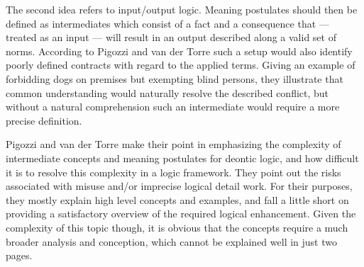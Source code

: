 \documentclass[12pt]{article}
\begin{document}
The second idea refers to input/output logic. Meaning postulates should then be defined as intermediates which consist of a fact and a consequence that --- treated as an input --- will result in an output described along a valid set of norms. According to Pigozzi and van der Torre such a setup would also identify poorly defined contracts with regard to the applied terms. Giving an example of forbidding dogs on premises but exempting blind persons, they illustrate that common understanding would naturally resolve the described conflict, but without a natural comprehension such an intermediate would require a more precise definition.

Pigozzi and van der Torre make their point in emphasizing the complexity of intermediate concepts and meaning postulates for deontic logic, and how difficult it is to resolve this complexity in a logic framework. They point out the risks associated with misuse and/or imprecise logical detail work. For their purposes, they mostly explain high level concepts and examples, and fall a little short on providing a satisfactory overview of the required logical enhancement. Given the complexity of this topic though, it is obvious that the concepts require a much broader analysis and conception, which cannot be explained well in just two pages.



\end{document}
